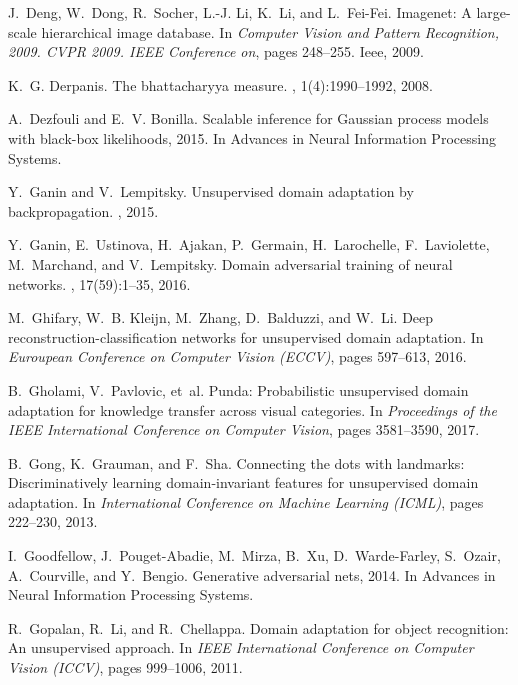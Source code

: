\documentclass[10pt,letterpaper]{article}
\begin{document}
\begin{thebibliography}{10}
J.~Deng, W.~Dong, R.~Socher, L.-J. Li, K.~Li, and L.~Fei-Fei.
\newblock Imagenet: A large-scale hierarchical image database.
\newblock In {\em Computer Vision and Pattern Recognition, 2009. CVPR 2009.
  IEEE Conference on}, pages 248--255. Ieee, 2009.

K.~G. Derpanis.
\newblock The bhattacharyya measure.
, 1(4):1990--1992, 2008.

A.~Dezfouli and E.~V. Bonilla.
\newblock Scalable inference for {G}aussian process models with black-box
  likelihoods, 2015.
\newblock In Advances in Neural Information Processing Systems.

Y.~Ganin and V.~Lempitsky.
\newblock Unsupervised domain adaptation by backpropagation.
, 2015.

Y.~Ganin, E.~Ustinova, H.~Ajakan, P.~Germain, H.~Larochelle, F.~Laviolette,
  M.~Marchand, and V.~Lempitsky.
\newblock Domain adversarial training of neural networks.
, 17(59):1--35, 2016.

M.~Ghifary, W.~B. Kleijn, M.~Zhang, D.~Balduzzi, and W.~Li.
\newblock Deep reconstruction-classification networks for unsupervised domain
  adaptation.
\newblock In {\em Euroupean Conference on Computer Vision (ECCV)}, pages
  597--613, 2016.

B.~Gholami, V.~Pavlovic, et~al.
\newblock Punda: Probabilistic unsupervised domain adaptation for knowledge
  transfer across visual categories.
\newblock In {\em Proceedings of the IEEE International Conference on Computer
  Vision}, pages 3581--3590, 2017.

B.~Gong, K.~Grauman, and F.~Sha.
\newblock Connecting the dots with landmarks: Discriminatively learning
  domain-invariant features for unsupervised domain adaptation.
\newblock In {\em International Conference on Machine Learning (ICML)}, pages
  222--230, 2013.

I.~Goodfellow, J.~Pouget-Abadie, M.~Mirza, B.~Xu, D.~Warde-Farley, S.~Ozair,
  A.~Courville, and Y.~Bengio.
\newblock Generative adversarial nets, 2014.
\newblock In Advances in Neural Information Processing Systems.

R.~Gopalan, R.~Li, and R.~Chellappa.
\newblock Domain adaptation for object recognition: An unsupervised approach.
\newblock In {\em IEEE International Conference on Computer Vision (ICCV)},
  pages 999--1006, 2011.


\end{thebibliography}
\end{document}
